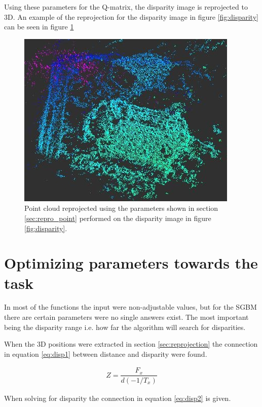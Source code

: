 Using these parameters for the Q-matrix, the disparity image is reprojected to 3D. An example of the reprojection for the disparity image in figure \ref{fig:disparity} can be seen in figure \ref{fig:point_repro}


\begin{figure}[h!]
  \centering
    \includegraphics[scale=0.7]{graphics/06_vision/point_cloud_example2.jpg} %
  \caption{Point cloud reprojected using the parameters shown in section \ref{sec:repro_point} performed on the disparity image in figure \ref{fig:disparity}. }
    \label{fig:point_repro}
\end{figure}


\section{ Optimizing parameters towards the task } \label{sec:optimizing_parameters}

In most of the functions the input were non-adjustable values, but for the SGBM there are certain parameters were no single answers exist. The most important being the disparity range i.e. how far the algorithm will search for disparities.


When the 3D positions were extracted in section \ref{sec:reprojection} the connection in equation \ref{eq:disp1} between distance and disparity were found.

\begin{equation}\label{eq:disp1}
\begin{split}
Z = \dfrac{F_{x}}{ d(-1/T_{x})}
\end{split}
\end{equation} 

When solving for disparity the connection in equation \ref{eq:disp2} is given.

